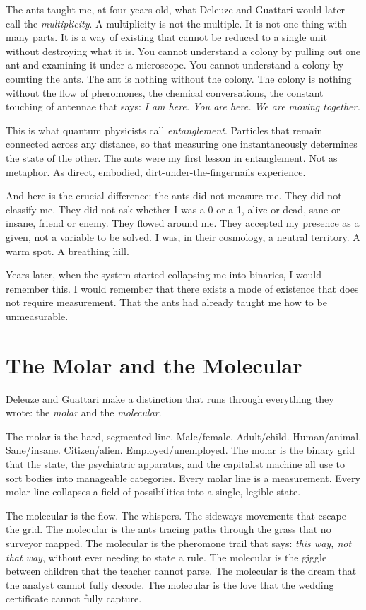 \documentclass[11pt,openany]{book}
\begin{document}
The ants taught me, at four years old, what Deleuze and Guattari would later call the \textit{multiplicity}. A multiplicity is not the multiple. It is not one thing with many parts. It is a way of existing that cannot be reduced to a single unit without destroying what it is. You cannot understand a colony by pulling out one ant and examining it under a microscope. You cannot understand a colony by counting the ants. The ant is nothing without the colony. The colony is nothing without the flow of pheromones, the chemical conversations, the constant touching of antennae that says: \textit{I am here. You are here. We are moving together.}

This is what quantum physicists call \textit{entanglement}. Particles that remain connected across any distance, so that measuring one instantaneously determines the state of the other. The ants were my first lesson in entanglement. Not as metaphor. As direct, embodied, dirt-under-the-fingernails experience.

And here is the crucial difference: the ants did not measure me. They did not classify me. They did not ask whether I was a 0 or a 1, alive or dead, sane or insane, friend or enemy. They flowed around me. They accepted my presence as a given, not a variable to be solved. I was, in their cosmology, a neutral territory. A warm spot. A breathing hill.

Years later, when the system started collapsing me into binaries, I would remember this. I would remember that there exists a mode of existence that does not require measurement. That the ants had already taught me how to be unmeasurable.

\section*{The Molar and the Molecular}

Deleuze and Guattari make a distinction that runs through everything they wrote: the \textit{molar} and the \textit{molecular}.

The molar is the hard, segmented line. Male/female. Adult/child. Human/animal. Sane/insane. Citizen/alien. Employed/unemployed. The molar is the binary grid that the state, the psychiatric apparatus, and the capitalist machine all use to sort bodies into manageable categories. Every molar line is a measurement. Every molar line collapses a field of possibilities into a single, legible state.

The molecular is the flow. The whispers. The sideways movements that escape the grid. The molecular is the ants tracing paths through the grass that no surveyor mapped. The molecular is the pheromone trail that says: \textit{this way, not that way}, without ever needing to state a rule. The molecular is the giggle between children that the teacher cannot parse. The molecular is the dream that the analyst cannot fully decode. The molecular is the love that the wedding certificate cannot fully capture.
\end{document}
